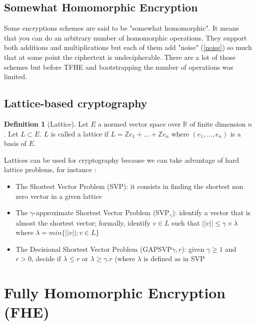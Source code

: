 \documentclass{article}
\newcommand{\Z}{\mathbb{Z}}
\newcommand{\R}{\mathbb{R}}
\theoremstyle{definition}
\newtheorem{definition}{Definition}[section]
\theoremstyle{Theorem}
\begin{document}

\subsection{Somewhat Homomorphic Encryption}

Some encryptions schemes are said to be "somewhat homomorphic". It means that you can do an arbitrary number of homomorphic operations. They support both additions and multiplications but each of them add "noise" (\ref{noise}) so much that at some point the ciphertext is undecipherable. There are a lot of those schemes but before TFHE and bootstrapping the number of operations was limited. 


\subsection{Lattice-based cryptography}
\begin{definition}[Lattice]

Let $E$ a normed vector space over $\R$ of finite dimension $n$. Let $L\subset E$. $L$ is called a lattice if $L=\Z e_1 + ... + \Z e_n$ where $(e_1, ..., e_n)$ is a basis of $E$. 

\end{definition}


Lattices can be used for cryptography because we can take advantage of hard lattice problems, for instance :
\begin{itemize}
    \item The Shortest Vector Problem (SVP): it consists in finding the shortest non zero vector in a given lattice
    \item The $\gamma$-approximate Shortest Vector Problem (SVP$_\gamma$):  identify a vector that is almost the shortest vector; formally, identify $v\in L$ such that $||v||\leq \gamma \times \lambda$ where $\lambda = min\{||v||;v\in L\}$
    \item The Decisional Shortest Vector Problem (GAPSVP$\gamma,r$): given $\gamma \geq 1$ and $r>0$, decide if $\lambda \leq r$ or $\lambda \geq \gamma .r$ (where $\lambda$ is defined as in SVP
\end{itemize}



\newpage
\section{Fully Homomorphic Encryption (FHE)}
\end{document}
